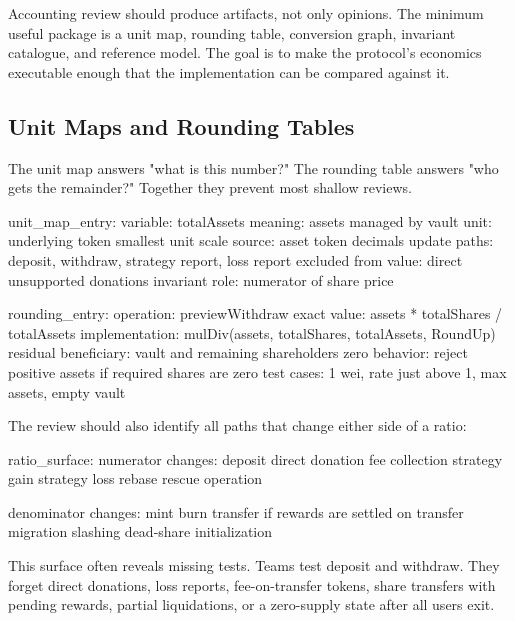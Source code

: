 Accounting review should produce artifacts, not only opinions. The minimum useful package is a unit map, rounding table, conversion graph, invariant catalogue, and reference model. The goal is to make the protocol's economics executable enough that the implementation can be compared against it.

\subsection{Unit Maps and Rounding Tables}

The unit map answers "what is this number?" The rounding table answers "who gets the remainder?" Together they prevent most shallow reviews.

\begin{codeblock}
unit_map_entry:
    variable: totalAssets
    meaning: assets managed by vault
    unit: underlying token smallest unit
    scale source: asset token decimals
    update paths: deposit, withdraw, strategy report, loss report
    excluded from value: direct unsupported donations
    invariant role: numerator of share price
\end{codeblock}

\begin{codeblock}
rounding_entry:
    operation: previewWithdraw
    exact value: assets * totalShares / totalAssets
    implementation: mulDiv(assets, totalShares, totalAssets, RoundUp)
    residual beneficiary: vault and remaining shareholders
    zero behavior: reject positive assets if required shares are zero
    test cases: 1 wei, rate just above 1, max assets, empty vault
\end{codeblock}

The review should also identify all paths that change either side of a ratio:

\begin{codeblock}
ratio_surface:
    numerator changes:
        deposit
        direct donation
        fee collection
        strategy gain
        strategy loss
        rebase
        rescue operation

    denominator changes:
        mint
        burn
        transfer if rewards are settled on transfer
        migration
        slashing
        dead-share initialization
\end{codeblock}

This surface often reveals missing tests. Teams test deposit and withdraw. They forget direct donations, loss reports, fee-on-transfer tokens, share transfers with pending rewards, partial liquidations, or a zero-supply state after all users exit.

